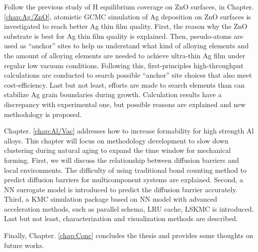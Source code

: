 Follow the previous study of H equilibrium coverage on ZnO surfaces, in Chapter. \ref{chap:Ag/ZnO}, atomistic \acf{GCMC} simulation of Ag deposition on ZnO surfaces is investigated to reach better Ag thin film quality. First, the reason why the ZnO substrate is best for Ag thin film quality is explained. Then, pseudo-atoms are used as ``anchor'' sites to help us understand what kind of alloying elements and the amount of alloying elements are needed to achieve ultra-thin Ag film under regular low vacuum conditions. Following this, first-principles high-throughput calculations are conducted to search possible ``anchor'' site choices that also meet cost-efficiency. Last but not least, efforts are made to search elements than can stabilize Ag grain boundaries during growth. Calculation results have a discrepancy with experimental one, but possible reasons are explained and new methodology is proposed.

Chapter. \ref{chap:Al/Vac} addresses how to increase formability for high strength Al alloys. This chapter will focus on methodology development to slow down clustering during natural aging to expand the time window for mechanical forming. First, we will discuss the relationship between diffusion barriers and local environments. The difficulty of using traditional bond counting method to predict diffusion barriers for multicomponent systems are explained. Second, a \acf{NN} surrogate model is introduced to predict the diffusion barrier accurately. Third, a \ac{KMC} simulation package based on \ac{NN} model with advanced acceleration methods, such as parallel schema, \acf{LRU} cache, \acf{LSKMC} is introduced. Last but not least, characterization and visualization methods are described.

Finally, Chapter. \ref{chap:Conc} concludes the thesis and provides some thoughts on future works.